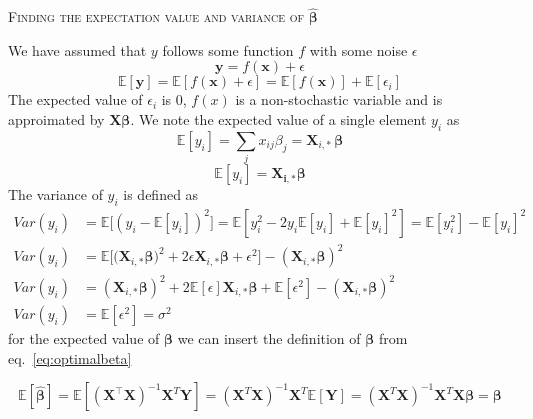\documentclass[twoside,11pt]{report}
\begin{document}
\begin{tcolorbox}
    \centering
    \textsc{ Finding the expectation value and variance of $\boldsymbol{\hat{\beta}}$}
\end{tcolorbox}
We have assumed that $y$ follows some function $f$ with some noise $\epsilon$
$$
\mathbf{y} = f(\mathbf{x}) + \epsilon
$$
$$
\mathbb{E}[\mathbf{y}] = \mathbb{E}[f(\mathbf{x} )+ \epsilon] = \mathbb{E}[f(\mathbf{x})] + \mathbb{E}[\epsilon_i]
$$
The expected value of $\epsilon_i$ is $0$, $f(x)$ is a non-stochastic variable and is approimated by $\boldsymbol{X}\boldsymbol{\beta}$.
We note the expected value of a single element $y_i$ as
$$
\mathbb{E}[y_i]  =\sum_{j}x_{ij} \beta_j=\mathbf{X}_{i, \ast} \, \boldsymbol{\beta}
$$
$$
\mathbb{E}[y_i] = \boldsymbol{X_{i,*}}\boldsymbol{\beta}
$$
The variance of $y_i$ is defined as
\begin{align*}
Var(y_i) &= \mathbb{E}\big[(y_i - \mathbb{E}[y_i])^2\big] = \mathbb{E}\left[y_i^2 - 2y_i\mathbb{E}[y_i] + \mathbb{E}[y_i]^2\right] = \mathbb{E}[y_i^2] - \mathbb{E}[y_i]^2\\
Var(y_i) &= \mathbb{E}\big[\big(\mathbf{X}_{i,*}\mathbf{\beta}\big)^2 + 2\epsilon \mathbf{X}_{i,*}\mathbf{\beta} + \epsilon^2 \big] - (\mathbf{X}_{i,*}\mathbf{\beta})^2\\
Var(y_i) &= (\mathbf{X}_{i,*}\mathbf{\beta})^2 + 2\mathbb{E}[\epsilon]\mathbf{X}_{i,*}\mathbf{\beta} + \mathbb{E}[\epsilon^2] - (\mathbf{X}_{i,*}\mathbf{\beta})^2\\
Var(y_i) &= \mathbb{E}[\epsilon^2] = \sigma^2
\end{align*}
for the expected value of $\boldsymbol{\beta}$ we can insert the definition of $\boldsymbol{\beta}$ from eq.~\ref{eq:optimalbeta}


$$
\mathbb{E}[\mathbf{\hat{\beta}}] = \mathbb{E}[ (\mathbf{X}^{\top} \mathbf{X})^{-1}\mathbf{X}^{T} \mathbf{Y}]=(\mathbf{X}^{T} \mathbf{X})^{-1}\mathbf{X}^{T} \mathbb{E}[ \mathbf{Y}]=(\mathbf{X}^{T} \mathbf{X})^{-1} \mathbf{X}^{T}\mathbf{X}\mathbf{\beta}=\mathbf{\beta}
$$
\end{document}
